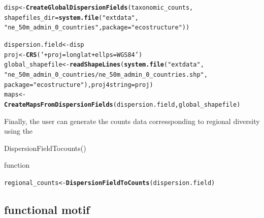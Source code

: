 \documentclass[12pt]{article}\usepackage[]{graphicx}\usepackage[usenames,dvipsnames]{color}
\makeatletter
\newcommand{\hlstr}[1]{\textcolor[rgb]{0.192,0.494,0.8}{#1}}%
\newcommand{\hlstd}[1]{\textcolor[rgb]{0.345,0.345,0.345}{#1}}%
\newcommand{\hlkwb}[1]{\textcolor[rgb]{0.69,0.353,0.396}{#1}}%
\newcommand{\hlkwc}[1]{\textcolor[rgb]{0.333,0.667,0.333}{#1}}%
\newcommand{\hlkwd}[1]{\textcolor[rgb]{0.737,0.353,0.396}{\textbf{#1}}}%
\newenvironment{kframe}{%
 \def\at@end@of@kframe{}%
 \ifinner\ifhmode%
  \def\at@end@of@kframe{\end{minipage}}%
  \begin{minipage}{\columnwidth}%
 \fi\fi%
 \def\FrameCommand##1{\hskip\@totalleftmargin \hskip-\fboxsep
 \colorbox{shadecolor}{##1}\hskip-\fboxsep
     \hskip-\linewidth \hskip-\@totalleftmargin \hskip\columnwidth}%
 \MakeFramed {\advance\hsize-\width
   \@totalleftmargin\z@ \linewidth\hsize
   \@setminipage}}%
 {\par\unskip\endMakeFramed%
 \at@end@of@kframe}
\newenvironment{knitrout}{}{} %
\makeatother
\begin{document}
\begin{knitrout}
\color{fgcolor}\begin{kframe}
\begin{alltt}
\hlstd{disp} \hlkwb{<-} \hlkwd{CreateGlobalDispersionFields}\hlstd{(taxonomic_counts,}
              \hlkwc{shapefiles_dir} \hlstd{=} \hlkwd{system.file}\hlstd{(}\hlstr{"extdata"}\hlstd{,}
                    \hlstr{"ne_50m_admin_0_countries"}\hlstd{,} \hlkwc{package} \hlstd{=} \hlstr{"ecostructure"}\hlstd{))}
\end{alltt}
\end{kframe}
\end{knitrout}


\begin{knitrout}
\color{fgcolor}\begin{kframe}
\begin{alltt}
\hlstd{dispersion.field} \hlkwb{<-} \hlstd{disp}
\hlstd{proj} \hlkwb{<-} \hlkwd{CRS}\hlstd{(}\hlstr{' +proj=longlat +ellps=WGS84'}\hlstd{)}
\hlstd{global_shapefile} \hlkwb{<-} \hlkwd{readShapeLines}\hlstd{(}\hlkwd{system.file}\hlstd{(}\hlstr{"extdata"}\hlstd{,}
         \hlstr{"ne_50m_admin_0_countries/ne_50m_admin_0_countries.shp"}\hlstd{,}
          \hlkwc{package} \hlstd{=} \hlstr{"ecostructure"}\hlstd{),} \hlkwc{proj4string}\hlstd{=proj)}
\hlstd{maps} \hlkwb{<-} \hlkwd{CreateMapsFromDispersionFields}\hlstd{(dispersion.field, global_shapefile)}
\end{alltt}
\end{kframe}
\end{knitrout}

Finally, the user can generate the counts data corressponding to regional diversity using the \begin{verb} DispersionFieldTocounts() \end{verb} function

\begin{knitrout}
\color{fgcolor}\begin{kframe}
\begin{alltt}
\hlstd{regional_counts} \hlkwb{<-} \hlkwd{DispersionFieldToCounts}\hlstd{(dispersion.field)}
\end{alltt}
\end{kframe}
\end{knitrout}


\subsection{functional motif}
\end{document}
